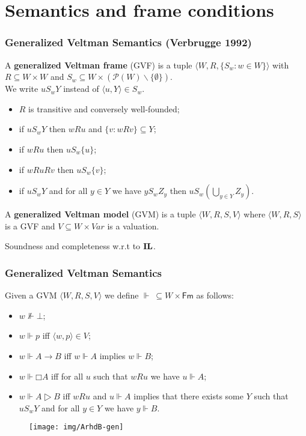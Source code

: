 \documentclass[xcolor={x11names}]{beamer}
\newcommand{\prin}[1]{\ensuremath{\textbf{\textup{#1}}}\xspace}
\newcommand{\il}{\prin{IL}}
\renewcommand{\sf}[1]{\ensuremath{\mathsf{#1}}}
\begin{document}
\section{Semantics and frame conditions}
\begin{frame}
  \frametitle{Generalized Veltman Semantics (Verbrugge 1992)}
  A \textbf{generalized Veltman frame} (GVF) is a tuple $⟨W,R,\{S_w:w∈W\}⟩$ with
  $R⊆W×W$ and $S_w⊆W×(𝒫(W)∖\{∅\})$.\\ We write $uS_wY$ instead of $⟨u,Y⟩∈S_w$.
  \begin{itemize}
    \item $R$ is transitive and conversely well-founded;
    \item if $uS_wY$ then $wRu$ and $\{v:wRv\}⊆Y$;
    \item if $wRu$ then $uS_w\{u\}$;
    \item if $wRuRv$ then $uS_w\{v\}$;
    \item if $uS_wY$ and for all $y∈Y$ we have $yS_wZ_y$ then $uS_w\left(⋃_{y∈Y}Z_y\right)$.
  \end{itemize}

  \pause{}
  \vspace{0.3cm}
  A \textbf{generalized Veltman model} (GVM) is a tuple $⟨W,R,S,V⟩$ where
  $⟨W,R,S⟩$ is a GVF and $V⊆W×Var$ is a valuation.

  \vspace{0.2cm}
  Soundness and completeness w.r.t to \il.
\end{frame}

\begin{frame}
  \frametitle{Generalized Veltman Semantics}
  Given a GVM $⟨W,R,S,V⟩$ we define $⊩\ ⊆W×\sf{Fm}$ as follows:
  \begin{itemize}
    \item $w⊮⊥$;
    \item $w⊩p$ iff $⟨w,p⟩∈V$;
    \item $w⊩A→B$ iff $w⊩A$ implies $w⊩B$;
    \item $w⊩□A$ iff for all $u$ such that $wRu$ we have $u⊩A$;
      \pause{}
    \item $w⊩A▷B$ iff $wRu$ and $u⊩A$ implies that there exists some $Y$ such
      that $uS_wY$ and for all $y∈Y$ we have $y⊩B$.
  \end{itemize}
  \begin{figure}[t]
    \texttt{[image: img/ArhdB-gen]}
    \centering
  \end{figure}
\end{frame}
\end{document}
